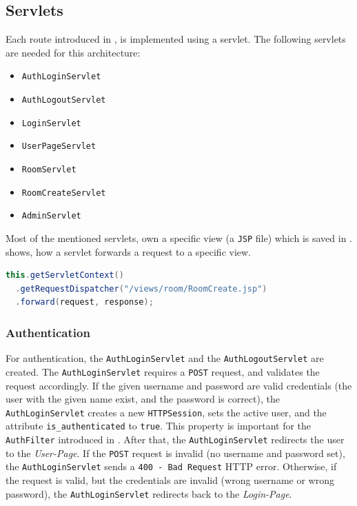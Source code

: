 \subsection{Servlets}\label{subsec:03_impl_servlets}
Each route introduced in , is implemented using a servlet. The following servlets are needed for this architecture:
\begin{itemize}
\item \texttt{AuthLoginServlet}
\item \texttt{AuthLogoutServlet}
\item \texttt{LoginServlet}
\item \texttt{UserPageServlet}
\item \texttt{RoomServlet}
\item \texttt{RoomCreateServlet}
\item \texttt{AdminServlet}
\end{itemize}
Most of the mentioned servlets, own a specific view (a \texttt{JSP} file) which is saved in .
%
 shows, how a servlet forwards a request to a specific view.
\begin{lstlisting}[label=lst:03_impl_servlets_includeview, caption=Forward a request to a view, language=java]
this.getServletContext()
  .getRequestDispatcher("/views/room/RoomCreate.jsp")
  .forward(request, response);
\end{lstlisting}


\subsubsection{Authentication}\label{subsubsec:03_impl_servlets_auth}
For authentication, the \texttt{AuthLoginServlet} and the \texttt{AuthLogoutServlet} are created.
The \texttt{AuthLoginServlet} requires a \texttt{POST} request, and validates the request accordingly. If the given username and password are valid credentials (the user with the given name exist, and the password is correct), the \texttt{AuthLoginServlet} creates a new \texttt{HTTPSession}, sets the active user, and the attribute \texttt{is\_authenticated} to \texttt{true}. This property is important for the \texttt{AuthFilter} introduced in . After that, the \texttt{AuthLoginServlet} redirects the user to the \textit{User-Page}.
If the \texttt{POST} request is invalid (no username and password set), the \texttt{AuthLoginServlet} sends a \texttt{400 - Bad Request} HTTP error. Otherwise, if the request is valid, but the credentials are invalid (wrong username or wrong password), the \texttt{AuthLoginServlet} redirects back to the \textit{Login-Page}.

